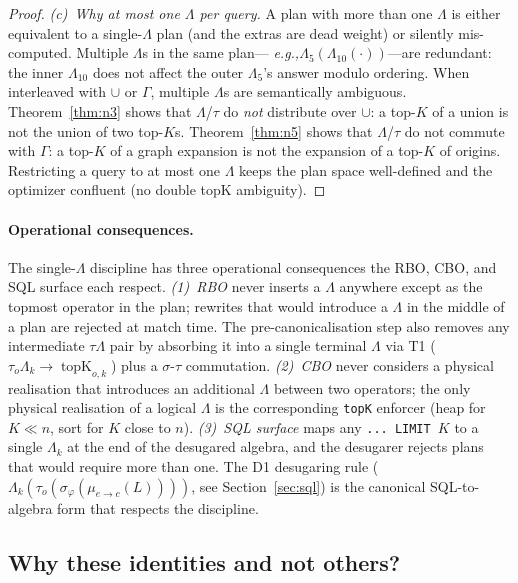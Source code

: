 \documentclass[sigconf]{acmart}
\theoremstyle{plain}
\theoremstyle{definition}
\newcommand{\topK}{\operatorname{topK}}
\newcommand{\eg}{\emph{e.g.,}\xspace}
\theoremstyle{remark}
\begin{document}
\begin{proof}
\emph{(c)~Why at most one $\Lambda$ per query.}
A plan with more than one $\Lambda$ is either equivalent to a
single-$\Lambda$ plan (and the extras are dead weight) or
silently mis-computed. Multiple $\Lambda$s in the same plan---
\eg $\Lambda_5(\Lambda_{10}(\cdot))$---are redundant: the inner
$\Lambda_{10}$ does not affect the outer $\Lambda_5$'s answer
modulo ordering. When interleaved with $\cup$ or $\Gamma$, multiple
$\Lambda$s are semantically ambiguous. Theorem~\ref{thm:n3} shows
that $\Lambda$/$\tau$ do \emph{not} distribute over $\cup$: a top-$K$
of a union is not the union of two top-$K$s. Theorem~\ref{thm:n5}
shows that $\Lambda$/$\tau$ do not commute with $\Gamma$: a top-$K$
of a graph expansion is not the expansion of a top-$K$ of
origins. Restricting a query to at most one $\Lambda$ keeps the
plan space well-defined and the optimizer confluent (no
double topK ambiguity).
\end{proof}

\paragraph{Operational consequences.}
The single-$\Lambda$ discipline has three operational consequences
the RBO, CBO, and SQL surface each respect.
\emph{(1)}~\emph{RBO} never inserts a $\Lambda$ anywhere except as
the topmost operator in the plan; rewrites that would introduce a
$\Lambda$ in the middle of a plan are rejected at match time. The
pre-canonicalisation step also removes any intermediate
$\tau\Lambda$ pair by absorbing it into a single terminal
$\Lambda$ via T1 ($\tau_o\Lambda_k \to \topK_{o,k}$) plus a
$\sigma$-$\tau$ commutation.
\emph{(2)}~\emph{CBO} never considers a physical realisation that
introduces an additional $\Lambda$ between two operators; the only
physical realisation of a logical $\Lambda$ is the corresponding
\texttt{topK} enforcer (heap for $K \ll n$, sort for $K$ close
to $n$).
\emph{(3)}~\emph{SQL surface} maps any \texttt{... LIMIT $K$}
to a single $\Lambda_k$ at the end of the desugared algebra, and
the desugarer rejects plans that would require more than one.
The D1 desugaring rule
($\Lambda_k(\tau_o(\sigma_\varphi(\mu_{e \to c}(L))))$, see
Section~\ref{sec:sql}) is the canonical SQL-to-algebra form
that respects the discipline.

\subsection{Why these identities and not others?}\label{sec:equational:why}
\end{document}
